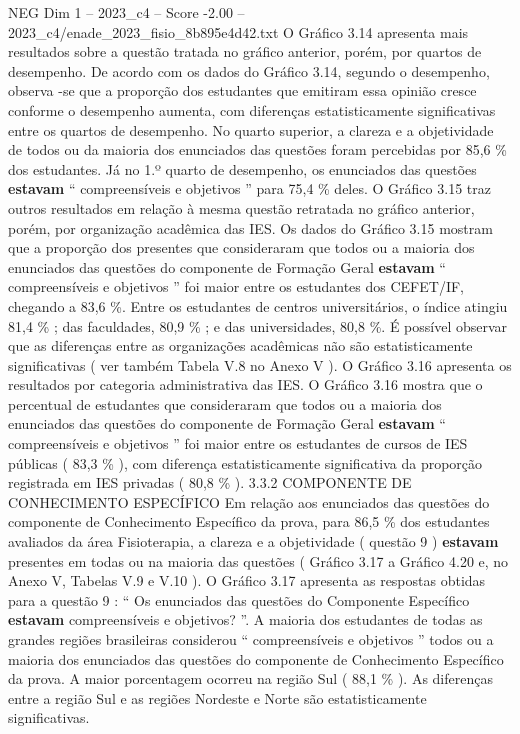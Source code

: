 \begin{textsample}{NEG Dim 1 – 2023\_c4 – Score -2.00 – 2023\_c4/enade\_2023\_fisio\_8b895e4d42.txt}
O Gráfico 3.14 apresenta mais resultados sobre a questão tratada no gráfico anterior, porém, por quartos de desempenho.
De acordo com os dados do Gráfico 3.14, segundo o desempenho, observa -se que a proporção dos estudantes que emitiram essa opinião cresce conforme o desempenho aumenta, com diferenças estatisticamente significativas entre os quartos de desempenho.
No quarto superior, a clareza e a objetividade de todos ou da maioria dos enunciados das questões foram percebidas por 85,6 \% dos estudantes.
Já no 1.º quarto de desempenho, os enunciados das questões \textbf{estavam} “ compreensíveis e objetivos ” para 75,4 \% deles.
O Gráfico 3.15 traz outros resultados em relação à mesma questão retratada no gráfico anterior, porém, por organização acadêmica das IES.
Os dados do Gráfico 3.15 mostram que a proporção dos presentes que consideraram que todos ou a maioria dos enunciados das questões do componente de Formação Geral \textbf{estavam} “ compreensíveis e objetivos ” foi maior entre os estudantes dos CEFET/IF, chegando a 83,6 \%.
Entre os estudantes de centros universitários, o índice atingiu 81,4 \% ; das faculdades, 80,9 \% ; e das universidades, 80,8 \%.
É possível observar que as diferenças entre as organizações acadêmicas não são estatisticamente significativas ( ver também Tabela V.8 no Anexo V ).
O Gráfico 3.16 apresenta os resultados por categoria administrativa das IES.
O Gráfico 3.16 mostra que o percentual de estudantes que consideraram que todos ou a maioria dos enunciados das questões do componente de Formação Geral \textbf{estavam} “ compreensíveis e objetivos ” foi maior entre os estudantes de cursos de IES públicas ( 83,3 \% ), com diferença estatisticamente significativa da proporção registrada em IES privadas ( 80,8 \% ). 3.3.2 COMPONENTE DE CONHECIMENTO ESPECÍFICO Em relação aos enunciados das questões do componente de Conhecimento Específico da prova, para 86,5 \% dos estudantes avaliados da área Fisioterapia, a clareza e a objetividade ( questão 9 ) \textbf{estavam} presentes em todas ou na maioria das questões ( Gráfico 3.17 a Gráfico 4.20 e, no Anexo V, Tabelas V.9 e V.10 ).
O Gráfico 3.17 apresenta as respostas obtidas para a questão 9 : “ Os enunciados das questões do Componente Específico \textbf{estavam} compreensíveis e objetivos? ”.
A maioria dos estudantes de todas as grandes regiões brasileiras considerou “ compreensíveis e objetivos ” todos ou a maioria dos enunciados das questões do componente de Conhecimento Específico da prova.
A maior porcentagem ocorreu na região Sul ( 88,1 \% ).
As diferenças entre a região Sul e as regiões Nordeste e Norte são estatisticamente significativas.

\end{textsample}
